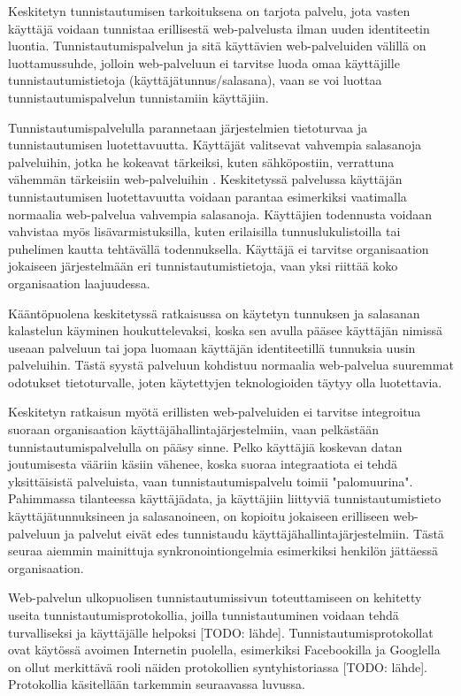 Keskitetyn tunnistautumisen tarkoituksena on tarjota palvelu, jota vasten käyttäjä voidaan tunnistaa erillisestä web-palvelusta ilman uuden identiteetin luontia. Tunnistautumispalvelun ja sitä käyttävien web-palveluiden välillä on luottamussuhde, jolloin web-palveluun ei tarvitse luoda omaa käyttäjille tunnistautumistietoja (käyttäjätunnus/salasana), vaan se voi luottaa tunnistautumispalvelun tunnistamiin käyttäjiin.

Tunnistautumispalvelulla parannetaan järjestelmien tietoturvaa ja tunnistautumisen luotettavuutta. Käyttäjät valitsevat vahvempia salasanoja palveluihin, jotka he kokeavat tärkeiksi, kuten sähköpostiin, verrattuna vähemmän tärkeisiin web-palveluihin \cite{password_habits}. Keskitetyssä palvelussa käyttäjän tunnistautumisen luotettavuutta voidaan parantaa esimerkiksi vaatimalla normaalia web-palvelua vahvempia salasanoja. Käyttäjien todennusta voidaan vahvistaa myös lisävarmistuksilla, kuten erilaisilla tunnuslukulistoilla tai puhelimen kautta tehtävällä todennuksella. Käyttäjä ei tarvitse organisaation jokaiseen järjestelmään eri tunnistautumistietoja, vaan yksi riittää koko organisaation laajuudessa.

Kääntöpuolena keskitetyssä ratkaisussa on käytetyn tunnuksen ja salasanan kalastelun käyminen houkuttelevaksi, koska sen avulla pääsee käyttäjän nimissä useaan palveluun tai jopa luomaan käyttäjän identiteetillä tunnuksia uusin palveluihin. Tästä syystä palveluun kohdistuu normaalia web-palvelua suuremmat odotukset tietoturvalle, joten käytettyjen teknologioiden täytyy olla luotettavia.

Keskitetyn ratkaisun myötä erillisten web-palveluiden ei tarvitse integroitua suoraan organisaation käyttäjähallintajärjestelmiin, vaan pelkästään tunnistautumispalvelulla on pääsy sinne. Pelko käyttäjiä koskevan datan joutumisesta vääriin käsiin vähenee, koska suoraa integraatiota ei tehdä yksittäisistä palveluista, vaan tunnistautumispalvelu toimii "palomuurina". Pahimmassa tilanteessa käyttäjädata, ja käyttäjiin liittyviä tunnistautumistieto käyttäjätunnuksineen ja salasanoineen, on kopioitu jokaiseen erilliseen web-palveluun ja palvelut eivät edes tunnistaudu käyttäjähallintajärjestelmiin. Tästä seuraa aiemmin mainittuja synkronointiongelmia esimerkiksi henkilön jättäessä organisaation.

Web-palvelun ulkopuolisen tunnistautumissivun toteuttamiseen on kehitetty useita tunnistautumisprotokollia, joilla tunnistautuminen voidaan tehdä turvalliseksi ja käyttäjälle helpoksi [TODO: lähde]. Tunnistautumisprotokollat ovat käytössä avoimen Internetin puolella, esimerkiksi Facebookilla ja Googlella on ollut merkittävä rooli näiden protokollien syntyhistoriassa [TODO: lähde]. Protokollia käsitellään tarkemmin seuraavassa luvussa.